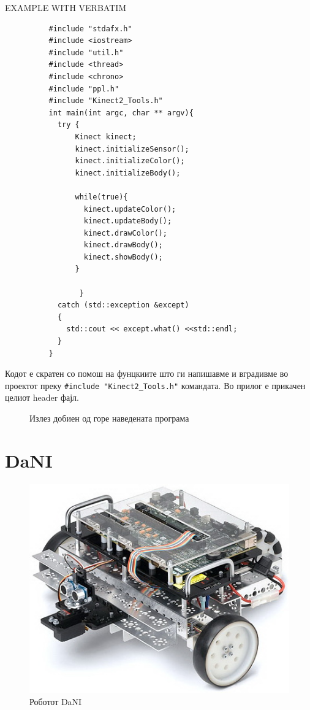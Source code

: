\documentclass[12pt]{article}
\begin{document}
      EXAMPLE WITH VERBATIM
      \begin{verbatim}
          #include "stdafx.h"
          #include <iostream>
          #include "util.h"
          #include <thread>
          #include <chrono>
          #include "ppl.h"
          #include "Kinect2_Tools.h"
          int main(int argc, char ** argv){
            try {
                Kinect kinect;
                kinect.initializeSensor();
                kinect.initializeColor();
                kinect.initializeBody();

                while(true){
                  kinect.updateColor();
                  kinect.updateBody();
                  kinect.drawColor();
                  kinect.drawBody();
                  kinect.showBody();
                }

                 }
            catch (std::exception &except)
            {
              std::cout << except.what() <<std::endl;
            }
          }
        \end{verbatim}

    Кодот е скратен со помош на фунцкиите што ги напишавме и вградивме во проектот преку \verb|#include "Kinect2_Tools.h"| командата. Во прилог е прикачен целиот header фајл.

    \begin{figure}[H]
      \centering
      \caption{Излез добиен од горе наведената програма}
      \label{fig:an-image-that-doesnt-exist-yet.png}
      \end{figure}

\newpage

\section{DaNI}
  \begin{figure}[H]
    \includegraphics[width=0.6\linewidth, keepaspectratio]{./images/dani_isometric.jpg}
    \centering
    \caption{Роботот DaNI}
    \label{fig:dani_isometric.jpg}
    \end{figure}
\end{document}
